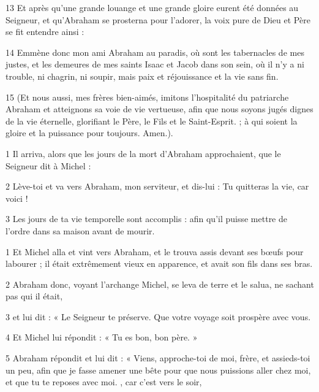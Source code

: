 \par 13 Et après qu'une grande louange et une grande gloire eurent été données au Seigneur, et qu'Abraham se prosterna pour l'adorer, la voix pure de Dieu et Père se fit entendre ainsi :

\par 14 Emmène donc mon ami Abraham au paradis, où sont les tabernacles de mes justes, et les demeures de mes saints Isaac et Jacob dans son sein, où il n'y a ni trouble, ni chagrin, ni soupir, mais paix et réjouissance et la vie sans fin.

\par 15 (Et nous aussi, mes frères bien-aimés, imitons l'hospitalité du patriarche Abraham et atteignons sa voie de vie vertueuse, afin que nous soyons jugés dignes de la vie éternelle, glorifiant le Père, le Fils et le Saint-Esprit. ; à qui soient la gloire et la puissance pour toujours. Amen.).



\par 1 Il arriva, alors que les jours de la mort d'Abraham approchaient, que le Seigneur dit à Michel :

\par 2 Lève-toi et va vers Abraham, mon serviteur, et dis-lui : Tu quitteras la vie, car voici !

\par 3 Les jours de ta vie temporelle sont accomplis : afin qu'il puisse mettre de l'ordre dans sa maison avant de mourir.


\par 1 Et Michel alla et vint vers Abraham, et le trouva assis devant ses bœufs pour labourer ; il était extrêmement vieux en apparence, et avait son fils dans ses bras.

\par 2 Abraham donc, voyant l'archange Michel, se leva de terre et le salua, ne sachant pas qui il était,

\par 3 et lui dit : « Le Seigneur te préserve. Que votre voyage soit prospère avec vous.

\par 4 Et Michel lui répondit : « Tu es bon, bon père. »

\par 5 Abraham répondit et lui dit : « Viens, approche-toi de moi, frère, et assieds-toi un peu, afin que je fasse amener une bête pour que nous puissions aller chez moi, et que tu te reposes avec moi. , car c'est vers le soir,

